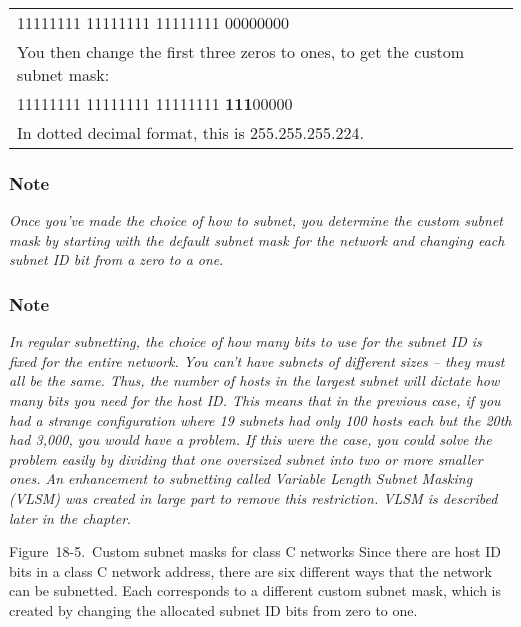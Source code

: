 \begin{longtable}[]{@{}l@{}}
\toprule
\endhead
11111111 11111111 11111111 00000000\tabularnewline
You then change the first three zeros to ones, to get the custom subnet
mask:\tabularnewline
11111111 11111111 11111111 {\textbf{111}}00000\tabularnewline
In dotted decimal format, this is 255.255.255.224.\tabularnewline
\bottomrule
\end{longtable}

\subsubsection[Note]{\texorpdfstring{\protect\hypertarget{ch18s05.htmlux5cux23note-71}{}{}Note}{Note}}

{\emph{Once you've made the choice of how to subnet, you determine the
custom subnet mask by starting with the default subnet mask for the
network and changing each subnet ID bit from a zero to a one}}.

\subsubsection[Note]{\texorpdfstring{\protect\hypertarget{ch18s05.htmlux5cux23note-72}{}{}Note}{Note}}

{\emph{In regular subnetting, the choice of how many bits to use for the
subnet ID is fixed for the entire network. You can't have subnets of
different sizes -- they must all be the same. Thus, the number of hosts
in the largest subnet will dictate how many bits you need for the host
ID. This means that in the previous case, if you had a strange
configuration where 19 subnets had only 100 hosts each but the 20th had
3,000, you would have a problem. If this were the case, you could solve
the problem easily by dividing that one oversized subnet into two or
more smaller ones. An enhancement to subnetting called Variable Length
Subnet Masking (VLSM) was created in large part to remove this
restriction.
VLSM is described later in the chapter}}.

\protect\hypertarget{ch18s05.htmlux5cux23custom_subnet_masks_for_class_c_networks}{}{}

\protect\hypertarget{ch18s05.htmlux5cux23I_mediaobject4_d1e18747}{}{}

Figure~18-5.~Custom subnet masks for class C networks Since there are
host ID bits in a class C network address, there are six different ways
that the network can be subnetted. Each corresponds to a different
custom subnet mask, which is created by changing the allocated subnet ID
bits from zero to one.

